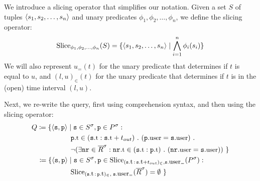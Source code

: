 We introduce a slicing operator that simplifies our
notation. Given a set $S$ of tuples $\langle s_1,s_2,\ldots,s_n \rangle$ and
unary predicates $\phi_1, \phi_2, \ldots, \phi_n$, we define the
slicing operator:
$$\text{Slice}_{\phi_1, \phi_2, \ldots, \phi_n} (S) =
\{\langle s_1,s_2,\ldots,s_n \rangle \mid \bigwedge_{i=1}^{n}\phi_i(s_i)\}
$$ 
We will also represent $u_=(t)$ for the unary predicate that determines if
$t$ is equal to $u$, and $(l,u)_\in(t)$ for the unary predicate that
determines if $t$ is in the (open) time interval $(l,u)$.

Next, we re-write the query, first using comprehension syntax, 
and then using the slicing operator:
\begin{align*}
&
Q \coloneq 
\{ \tuple{\symv{s}, \symv{p}} \mid 
\symv{s} \in \syms{S},
\symv{p} \in \syms{P}: 
\\ 
&
\qqquad\quad\;\;
\facc{\symv{p}}{t} \in
(\facc{\symv{s}}{t} : \facc{\symv{s}}{t} + t_{out})\ .\ 
(\facc{\symv{p}}{user} = \facc{\symv{s}}{user})\ .\ 
\\
&\qqquad\quad\;\;
\neg
(\exists
\symv{nr} \in \syms{\oR} : 
\facc{\symv{nr}}{t} \in (\facc{\symv{s}}{t} : \facc{\symv{p}}{t})\ .\ 
(\facc{\symv{nr}}{user} = \facc{\symv{s}}{user})
)
\ \}
\\
&
\;\;\; \coloneq 
\{ \tuple{\symv{s}, \symv{p}} \mid 
\symv{s} \in \syms{S},
\symv{p} \in 
\slice{\syms{P}}
{(\facc{\symv{s}}{t}\,:\,\facc{\symv{s}}{t} + t_{out})_\in,
	\facc{\symv{s}}{user}_=}
: 
\\ 
&\qqquad\quad\;\;
\slice{\syms{\oR}}
{(\facc{\symv{s}}{t}\,:\,\facc{\symv{p}}{t})_\in,\; \facc{\symv{s}}{user}_=} 
= \emptyset  
\ \}
\end{align*}

